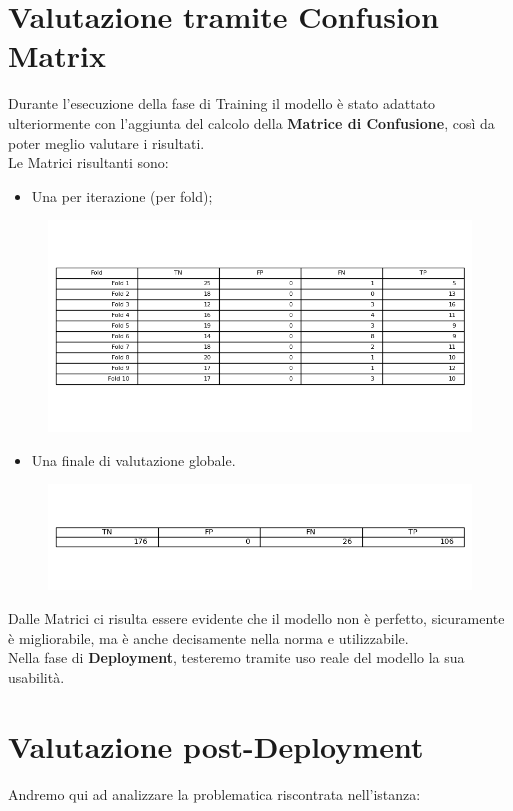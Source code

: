 \documentclass[a4paper,12pt]{report}
\begin{document}
\section{Valutazione tramite Confusion Matrix}
Durante l'esecuzione della fase di Training il modello è stato adattato ulteriormente con l'aggiunta del calcolo della \textbf{Matrice di Confusione}, così da poter meglio valutare i risultati.\\
Le Matrici risultanti sono:
\begin{itemize}
    \item Una per iterazione (per fold);
\end{itemize}
\begin{figure}[h]
\centering
\includegraphics[width=\textwidth]{confusion_matrix_perfold.png}
\end{figure}
\begin{itemize}
    \item Una finale di valutazione globale.
\end{itemize}
\begin{figure}[h]
\centering
\includegraphics[width=\textwidth]{confusion_matrix_final.png}
\end{figure}
Dalle Matrici ci risulta essere evidente che il modello non è perfetto, sicuramente è migliorabile, ma è anche decisamente nella norma e utilizzabile.\\
Nella fase di \textbf{Deployment}, testeremo tramite uso reale del modello la sua usabilità.
\newpage
\section{Valutazione post-Deployment}
Andremo qui ad analizzare la problematica riscontrata nell'istanza:
\end{document}
